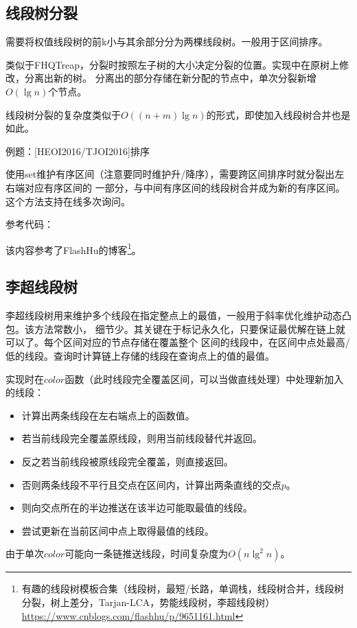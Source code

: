 \subsection{线段树分裂}
需要将权值线段树的前k小与其余部分分为两棵线段树。一般用于区间排序。

类似于FHQTreap，分裂时按照左子树的大小决定分裂的位置。实现中在原树上修改，分离出新的树。
分离出的部分存储在新分配的节点中，单次分裂新增$O(\lg n)$个节点。

线段树分裂的复杂度类似于$O((n+m)\lg n)$的形式，即使加入线段树合并也是如此。

例题：[HEOI2016/TJOI2016]排序

使用set维护有序区间（注意要同时维护升/降序），需要跨区间排序时就分裂出左右端对应有序区间的
一部分，与中间有序区间的线段树合并成为新的有序区间。这个方法支持在线多次询问。

参考代码：

该内容参考了FlashHu的博客\footnote{
    有趣的线段树模板合集（线段树，最短/长路，单调栈，线段树合并，线段树分裂，树上差分，Tarjan-LCA，势能线段树，李超线段树）\\
    \url{https://www.cnblogs.com/flashhu/p/9651161.html}
}。
\subsection{李超线段树}
李超线段树用来维护多个线段在指定整点上的最值，一般用于斜率优化维护动态凸包。该方法常数小，
细节少。其关键在于标记永久化，只要保证最优解在链上就可以了。每个区间对应的节点存储在覆盖整个
区间的线段中，在区间中点处最高/低的线段。查询时计算链上存储的线段在查询点上的值的最值。

实现时在$color$函数（此时线段完全覆盖区间，可以当做直线处理）中处理新加入的线段：
\begin{itemize}
    \item 计算出两条线段在左右端点上的函数值。
    \item 若当前线段完全覆盖原线段，则用当前线段替代并返回。
    \item 反之若当前线段被原线段完全覆盖，则直接返回。
    \item 否则两条线段不平行且交点在区间内，计算出两条直线的交点$p$。
    \item 则向交点所在的半边推送在该半边可能取最值的线段。
    \item 尝试更新在当前区间中点上取得最值的线段。
\end{itemize}

由于单次$color$可能向一条链推送线段，时间复杂度为$O(n\lg^2 n)$。

